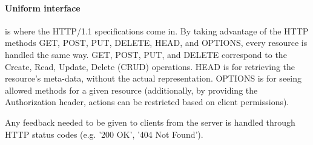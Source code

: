 \paragraph{Uniform interface} is where the HTTP/1.1 specifications come in.
By taking advantage of the HTTP methods GET, POST, PUT, DELETE, HEAD, and OPTIONS, every resource is handled the same way.
GET, POST, PUT, and DELETE correspond to the Create, Read, Update, Delete (CRUD) operations.
HEAD is for retrieving the resource's meta-data, without the actual representation.
OPTIONS is for seeing allowed methods for a given resource (additionally, by providing the Authorization header, actions can be restricted based on client permissions).

Any feedback needed to be given to clients from the server is handled through HTTP status codes (e.g. '200 OK', '404 Not Found').
